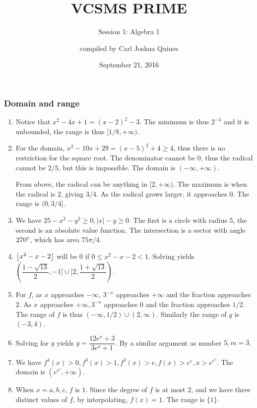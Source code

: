 \documentclass[10pt,paper=letter]{scrartcl}
\begin{document}
\title{VCSMS PRIME}
\subtitle{Session 1: Algebra 1}
\author{compiled by Carl Joshua Quines}
\date{September 21, 2016}

\maketitle

\subsubsection*{Domain and range}

\begin{enumerate}

\item Notice that $x^2 - 4x + 1 = (x - 2)^2 - 3$. The minimum is thus $2^{-3}$ and it is unbounded, the range is thus $[1/8, +\infty)$.

\item For the domain, $x^2 - 10x + 29 = (x - 5)^2 + 4 \geq 4$, thus there is no restriction for the square root. The denominator cannot be $0$, thus the radical cannot be $2/5$, but this is impossible. The domain is $(-\infty, +\infty)$.

From above, the radical can be anything in $[2, +\infty)$. The maximum is when the radical is $2$, giving $3/4$. As the radical grows larger, it approaches $0$. The range is $(0, 3/4]$.

\item We have $25 - x^2 - y^2 \geq 0, |x| - y \geq 0$. The first is a circle with radius $5$, the second is an absolute value function. The intersection is a sector with angle $270^\circ$, which has area $75\pi/4$.

\item $\left\lfloor x^2 - x - 2 \right\rfloor$ will be $0$ if $0 \leq x^2 - x - 2 < 1$. Solving yields $(\dfrac{1-\sqrt{13}}{2}, -1] \cup [2, \dfrac{1+\sqrt{13}}{2})$.

\item For $f$, as $x$ approaches $-\infty$, $3^{-x}$ approaches $+\infty$ and the fraction approaches $2$. As $x$ approaches $+\infty, 3^{-x}$ approaches $0$ and the fraction approaches $1/2$. The range of $f$ is thus $(-\infty, 1/2) \cup (2, \infty)$. Similarly the range of $g$ is $(-3, 4)$.

\item Solving for $y$ yields $y = \dfrac{12e^x + 3}{3e^x + 1}$. By a similar argument as number $5, m = 3$. 

\item We have $f^4(x) > 0, f^3(x) > 1, f^2(x) > e, f(x) > e^e, x > e^{e^e}$. The domain is $(e^{e^e}, +\infty)$.

\item When $x = a, b, c$, $f$ is $1$. Since the degree of $f$ is at most $2$, and we have three distinct values of $f$, by interpolating, $f(x) = 1$. The range is $\{1\}$.

\end{enumerate}
\end{document}
